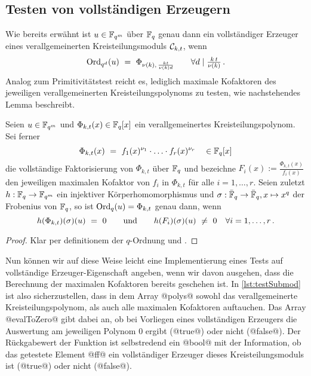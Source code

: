 \subsection{Testen von vollständigen Erzeugern}

Wie bereits erwähnt ist $u\in \mathbb{F}_{q^m}$ über $\mathbb{F}_q$ genau dann ein vollständiger
Erzeuger eines verallgemeinerten Kreisteilungsmoduls $\mathcal{C}_{k,t}$, wenn
\[ \operatorname{Ord}_{q^d}(u) \ =\  \Phi_{\nu(k),\, \frac{kt}{\nu(k)d}} \qquad
  \forall d\mid \tfrac{k\,t}{\nu(k)}\,.\]
Analog zum Primitivitätstest reicht es, lediglich maximale Kofaktoren des
jeweiligen verallgemeinerten Kreisteilungspolynoms zu testen, wie nachstehendes
Lemma beschreibt.

\begin{lemma}
  Seien $u\in \mathbb{F}_{q^m}$ und $\Phi_{k,t}(x) \in \mathbb{F}_q[x]$ ein verallgemeinertes
  Kreisteilungspolynom. Sei ferner
  \[ \Phi_{k,t}(x)  \ =\  f_1(x)^{\nu_1} \cdot \ldots \cdot
    f_r(x)^{\nu_r}\quad \in \mathbb{F}_q[x]\]
  die vollständige Faktorisierung von $\Phi_{k,t}$ über $\mathbb{F}_q$ und
  bezeichne $F_i(x) := \tfrac{\Phi_{k,t}(x)}{f_i(x)}$ den jeweiligen maximalen
  Kofaktor von $f_i$ in $\Phi_{k,t}$ für alle $i=1,\ldots,r$.
  Seien zuletzt $h: \mathbb{F}_q \to \mathbb{F}_{q^m}$ ein injektiver Körperhomomorphismus und 
  $\sigma:\bar {\mathbb{F}}_q \to \bar {\mathbb{F}}_q, x\mapsto x^q$ der Frobenius von $\mathbb{F}_q$, 
  so ist $\operatorname{Ord}_q(u) = \Phi_{k,t}$ genau dann, wenn
  \[h(\Phi_{k,t})(\sigma)(u) \ =\  0 
    \qquad\text{und}\qquad 
    h(F_i)(\sigma)(u) \ \neq\  0 \quad \forall i=1,\ldots,r \,.\]
\end{lemma}
\begin{proof}
  Klar per definitionem der $q$-Ordnung und .
\end{proof}


Nun können wir auf diese Weise leicht eine Implementierung eines Tests auf
vollständige Erzeuger-Eigenschaft angeben, wenn wir davon ausgehen, dass die
Berechnung der maximalen Kofaktoren bereits geschehen ist. In
\autoref{lst:testSubmod} ist also sicherzustellen, dass in dem Array
@polys@ sowohl das verallgemeinerte Kreisteilungspolynom, als auch alle 
maximalen Kofaktoren auftauchen. Das Array @evalToZero@ gibt dabei an, ob 
bei Vorliegen eines vollständigen Erzeugers die Auswertung am jeweiligen
Polynom $0$ ergibt (@true@) oder nicht (@false@). Der Rückgabewert der Funktion
ist selbstredend ein @bool@ mit der Information, ob das getestete Element @ff@
ein vollständiger Erzeuger dieses Kreisteilungsmoduls ist (@true@) oder nicht
(@false@).

